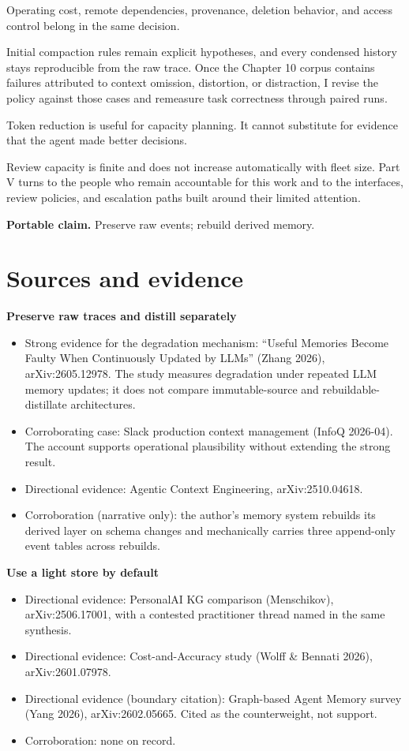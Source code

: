 Operating cost, remote dependencies, provenance, deletion behavior, and access control belong in the same decision.

Initial compaction rules remain explicit hypotheses, and every condensed history stays reproducible from the raw trace. Once the Chapter 10 corpus contains failures attributed to context omission, distortion, or distraction, I revise the policy against those cases and remeasure task correctness through paired runs.

Token reduction is useful for capacity planning. It cannot substitute for evidence that the agent made better decisions.

Review capacity is finite and does not increase automatically with fleet size. Part V turns to the people who remain accountable for this work and to the interfaces, review policies, and escalation paths built around their limited attention.

\textbf{Portable claim.} Preserve raw events; rebuild derived memory.

\section*{Sources and evidence}

\textbf{Preserve raw traces and distill separately}

\begin{itemize}
\tightlist
\item
  Strong evidence for the degradation mechanism: ``Useful Memories Become Faulty When Continuously Updated by LLMs'' (Zhang 2026), arXiv:2605.12978. The study measures degradation under repeated LLM memory updates; it does not compare immutable-source and rebuildable-distillate architectures.
\item
  Corroborating case: Slack production context management (InfoQ 2026-04). The account supports operational plausibility without extending the strong result.
\item
  Directional evidence: Agentic Context Engineering, arXiv:2510.04618.
\item
  Corroboration (narrative only): the author's memory system rebuilds its derived layer on schema changes and mechanically carries three append-only event tables across rebuilds.
\end{itemize}

\textbf{Use a light store by default}

\begin{itemize}
\tightlist
\item
  Directional evidence: PersonalAI KG comparison (Menschikov), arXiv:2506.17001, with a contested practitioner thread named in the same synthesis.
\item
  Directional evidence: Cost-and-Accuracy study (Wolff \& Bennati 2026), arXiv:2601.07978.
\item
  Directional evidence (boundary citation): Graph-based Agent Memory survey (Yang 2026), arXiv:2602.05665. Cited as the counterweight, not support.
\item
  Corroboration: none on record.
\end{itemize}

